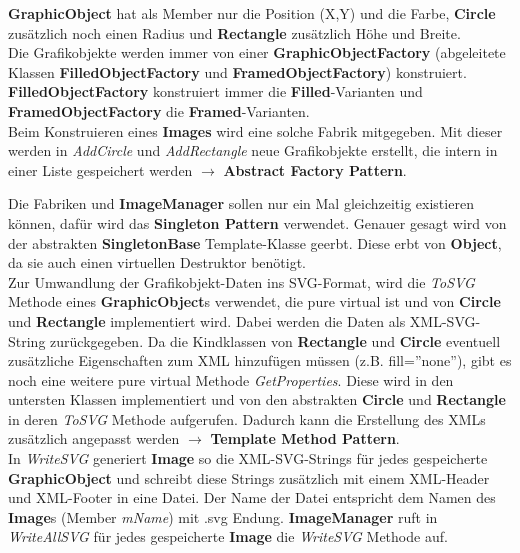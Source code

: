 \textbf{GraphicObject} hat als Member nur die Position (X,Y) und die Farbe, \textbf{Circle} zusätzlich noch einen Radius und \textbf{Rectangle} zusätzlich Höhe und Breite.\\

Die Grafikobjekte werden immer von einer \textbf{GraphicObjectFactory} (abgeleitete Klassen \textbf{FilledObjectFactory} und \textbf{FramedObjectFactory}) konstruiert. \textbf{FilledObjectFactory} konstruiert immer die \textbf{Filled}-Varianten und \textbf{FramedObjectFactory} die \textbf{Framed}-Varianten.\\

Beim Konstruieren eines \textbf{Images} wird eine solche Fabrik mitgegeben. Mit dieser werden in \textit{AddCircle} und \textit{AddRectangle} neue Grafikobjekte erstellt, die intern in einer Liste gespeichert werden $\rightarrow$ \textbf{Abstract Factory Pattern}.

Die Fabriken und \textbf{ImageManager} sollen nur ein Mal gleichzeitig existieren können, dafür wird das \textbf{Singleton Pattern} verwendet. Genauer gesagt wird von der abstrakten \textbf{SingletonBase} Template-Klasse geerbt. Diese erbt von \textbf{Object}, da sie auch einen virtuellen Destruktor benötigt.\\

Zur Umwandlung der Grafikobjekt-Daten ins SVG-Format, wird die \textit{ToSVG} Methode eines \textbf{GraphicObject}s verwendet, die pure virtual ist und von \textbf{Circle} und \textbf{Rectangle} implementiert wird. Dabei werden die Daten als XML-SVG-String zurückgegeben. Da die Kindklassen von \textbf{Rectangle} und \textbf{Circle} eventuell zusätzliche Eigenschaften zum XML hinzufügen müssen (z.B. fill=''none''), gibt es noch eine weitere pure virtual Methode \textit{GetProperties}. Diese wird in den untersten Klassen implementiert und von den abstrakten \textbf{Circle} und \textbf{Rectangle} in deren \textit{ToSVG} Methode aufgerufen. Dadurch kann die Erstellung des XMLs zusätzlich angepasst werden $\rightarrow$ \textbf{Template Method Pattern}.\\

In \textit{WriteSVG} generiert \textbf{Image} so die XML-SVG-Strings für jedes gespeicherte \textbf{GraphicObject} und schreibt diese Strings zusätzlich mit einem XML-Header und XML-Footer in eine Datei. Der Name der Datei entspricht dem Namen des \textbf{Image}s (Member \textit{mName}) mit .svg Endung.
\textbf{ImageManager} ruft in \textit{WriteAllSVG} für jedes gespeicherte \textbf{Image} die \textit{WriteSVG} Methode auf.\\

